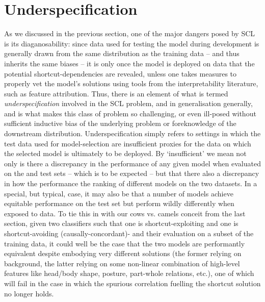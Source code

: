 \section{Underspecification}\label{sub:underspecification}
 
As we discussed in the previous section, one of the major dangers posed by \ac{SCL} is its
diaganosability: since data used for testing the model during development is generally drawn from
the same distribution as the training data -- and thus inherits the same biases -- it is only once
the model is deployed on \ood{} data that the potential shortcut-dependencies are revealed, unless
one takes measures to properly vet the model's solutions using tools from the interpretability
literature, such as feature attribution.
%
Thus, there is an element of what is termed \emph{underspecification} involved in the \ac{SCL} problem,
and in \ood{} generalisation generally, and is what makes this class of problem so challenging, or
even ill-posed without sufficient inductive bias of the underlying problem or foreknowledge of the
downstream distribution.
%
Underspecification simply refers to settings in which the \iid{} test data used for model-selection are
insufficient proxies for the data on which the selected model is ultimately to be deployed.
%
By `insufficient' we mean not only is there a discrepancy in the performance of any given model
when evaluated on the \iid{} and \ood{} test sets -- which is to be expected -- but that there also
a discrepancy in how the performance the ranking of different models on the two datasets.
%
In a special, but typical, case, it may also be that a number of models achieve equitable
performance on the \iid{} test set but perform wildly differently when exposed to \ood{} data.
%
To tie this in with our cows vs. camels conceit from the last section, given two classifiers such
that one is shortcut-exploiting and one is shortcut-avoiding (causally-concordant)- and their
evaluation on a subset of the training data, it could well be the case that the two models are
performantly equivalent despite embodying very different solutions (the former relying on
background, the latter relying on some non-linear combination of high-level features like head/body
shape, posture, part-whole relations, etc.), one of which will fail in the \ood{} case in which the
spurious correlation fuelling the shortcut solution no longer holds.

